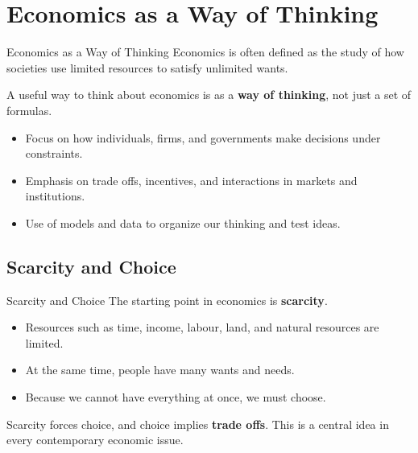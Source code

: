 \documentclass[aspectratio=169]{beamer}
\begin{document}
\section{Economics as a Way of Thinking}

\begin{frame}{Economics as a Way of Thinking}
  \transfade
  Economics is often defined as the study of how societies use limited resources to satisfy
  unlimited wants.

  \vspace{0.3cm}
  A useful way to think about economics is as a \textbf{way of thinking}, not just a set of formulas.

  \begin{itemize}
    \item Focus on how individuals, firms, and governments make decisions under constraints.
    \item Emphasis on trade offs, incentives, and interactions in markets and institutions.
    \item Use of models and data to organize our thinking and test ideas.
  \end{itemize}
\end{frame}

\subsection{Scarcity and Choice}

\begin{frame}{Scarcity and Choice}
  \transfade
  The starting point in economics is \textbf{scarcity}.

  \begin{itemize}
    \item Resources such as time, income, labour, land, and natural resources are limited.
    \item At the same time, people have many wants and needs.
    \item Because we cannot have everything at once, we must choose.
  \end{itemize}

  \vspace{0.3cm}
  Scarcity forces choice, and choice implies \textbf{trade offs}. This is a central idea in every
  contemporary economic issue.
\end{frame}
\end{document}
